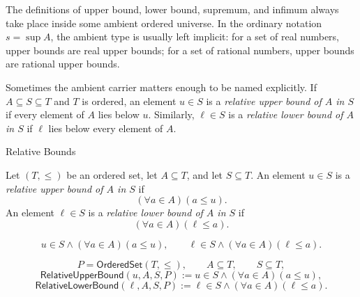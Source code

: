 
\begin{remark*}[Exposition]
The definitions of upper bound, lower bound, supremum, and infimum always
take place inside some ambient ordered universe.  In the ordinary notation
$s=\sup A$, the ambient type is usually left implicit: for a set of real
numbers, upper bounds are real upper bounds; for a set of rational numbers,
upper bounds are rational upper bounds.

Sometimes the ambient carrier matters enough to be named explicitly.  If
$A\subseteq S\subseteq T$ and $T$ is ordered, an element $u\in S$ is a
\emph{relative upper bound of $A$ in $S$} if every element of $A$ lies below
$u$.  Similarly, $\ell\in S$ is a \emph{relative lower bound of $A$ in $S$}
if $\ell$ lies below every element of $A$.
\end{remark*}

\begin{definitionbox}{Relative Bounds}
\begin{definition}
\label{def:relative-bounds}
Let $(T,\leq)$ be an ordered set, let $A\subseteq T$, and let $S\subseteq T$.
An element $u\in S$ is a \emph{relative upper bound of $A$ in $S$} if
\[
  (\forall a\in A)(a\leq u).
\]
An element $\ell\in S$ is a \emph{relative lower bound of $A$ in $S$} if
\[
  (\forall a\in A)(\ell\leq a).
\]
\end{definition}
\end{definitionbox}

\begin{remark*}
\[
  u\in S\land(\forall a\in A)(a\leq u),
  \qquad
  \ell\in S\land(\forall a\in A)(\ell\leq a).
\]
\end{remark*}

\begin{remark*}
\[
  P=\mathsf{OrderedSet}(T,\leq),\qquad A\subseteq T,\qquad S\subseteq T,
\]
\[
  \mathsf{RelativeUpperBound}(u,A,S,P)
  :=u\in S\land(\forall a\in A)(a\leq u),
\]
\[
  \mathsf{RelativeLowerBound}(\ell,A,S,P)
  :=\ell\in S\land(\forall a\in A)(\ell\leq a).
\]
\end{remark*}

